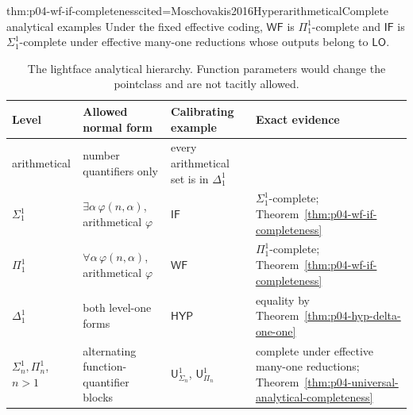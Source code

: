 \begin{hbtheorem}{thm:p04-wf-if-completeness}{cited=Moschovakis2016Hyperarithmetical}{Complete analytical examples}
Under the fixed effective coding, \(\mathsf{WF}\) is \(\Pi^1_1\)-complete and
\(\mathsf{IF}\) is \(\Sigma^1_1\)-complete under effective many-one
reductions whose outputs belong to \(\mathsf{LO}\).
\end{hbtheorem}

\begin{table}[htbp]
\centering
\small
\begin{tabular}{@{}p{}p{}p{}p{}@{}}
\toprule
Level & Allowed normal form & Calibrating example & Exact evidence \\
\midrule
arithmetical & number quantifiers only & every arithmetical set is in
\(\Delta^1_1\) & \cite[secs.~3A--3D]{Moschovakis2016Hyperarithmetical} \\
\(\Sigma^1_1\) & \(\exists\alpha\,\varphi(n,\alpha)\), arithmetical
\(\varphi\) & \(\mathsf{IF}\) & \(\Sigma^1_1\)-complete;
Theorem~\ref{thm:p04-wf-if-completeness} \\
\(\Pi^1_1\) & \(\forall\alpha\,\varphi(n,\alpha)\), arithmetical
\(\varphi\) & \(\mathsf{WF}\) & \(\Pi^1_1\)-complete;
Theorem~\ref{thm:p04-wf-if-completeness} \\
\(\Delta^1_1\) & both level-one forms & \(\mathsf{HYP}\) & equality by
Theorem~\ref{thm:p04-hyp-delta-one-one} \\
\(\Sigma^1_n,\Pi^1_n\), \(n>1\) & alternating function-quantifier blocks &
\(\mathsf U^1_{\Sigma_n}\), \(\mathsf U^1_{\Pi_n}\) & complete under
effective many-one reductions; Theorem~\ref{thm:p04-universal-analytical-completeness} \\
\bottomrule
\end{tabular}
\caption{The lightface analytical hierarchy.  Function
parameters would change the pointclass and are not tacitly allowed.}
\label{tab:p04-analytical-hierarchy}
\end{table}

